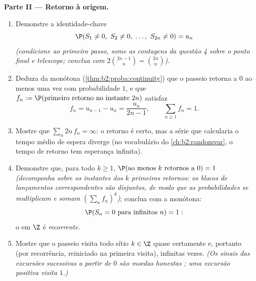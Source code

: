 \begin{problem}
\medskip
\noindent\textbf{Parte II --- Retorno à origem.}
\begin{enumerate}[resume]
  \item Demonstre a identidade-chave
        \[
        \P(S_1 \neq 0,\ S_2 \neq 0,\ \dots,\ S_{2n} \neq 0) =
        u_n
        \]
        \emph{(condicione ao primeiro passo, some as contagens da
        questão 4 sobre o ponto final e telescope; conclua
        com $2\binom{2n-1}{n} = \binom{2n}{n}$)}.
  \item Deduza da  monótona
        (\cref{thm:b2:proba:continuity}) que o passeio
        retorna a $0$ ao menos uma vez com probabilidade $1$,
        e que $f_n := \P(\text{primeiro retorno no instante }2n)$
        satisfaz
        \[
        f_n = u_{n-1} - u_n = \frac{u_n}{2n-1},
        \qquad \sum_{n\geq1}f_n = 1 .
        \]
  \item Mostre que $\sum_n 2n\,f_n = \infty$: o retorno é
        certo, mas a série que calcularia o tempo médio
        de espera diverge (no vocabulário do
        \cref{ch:b2:randomvar}, o tempo de retorno tem esperança
        infinita).
  \item Demonstre que, para todo $k \geq 1$, $\P(\text{ao menos }
        k\text{ retornos a }0) = 1$ \emph{(decomponha sobre os
        instantes dos $k$ primeiros retornos: os blocos de
        lançamentos correspondentes são disjuntos, de modo que as probabilidades
        se multiplicam e somam $(\sum_nf_n)^k$)}; conclua com a
         monótona:
        \[
        \P(S_n = 0 \text{ para infinitos } n) = 1 :
        \]
        o  em $\Z$ é \emph{recorrente}.
  \item Mostre que o passeio visita todo sítio $k \in \Z$
        quase certamente e, portanto (por recorrência, reiniciado na
        primeira visita), infinitas vezes. \emph{(Os sinais das
        excursões sucessivas a partir de $0$ são moedas honestas
        ; uma excursão positiva visita $1$.)}
\end{enumerate}


\end{problem}
